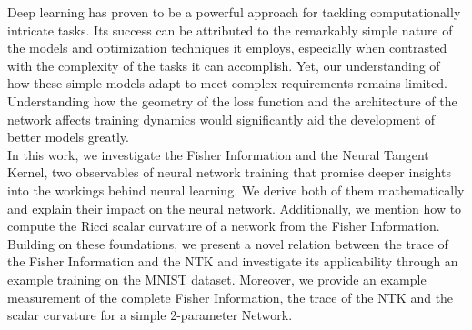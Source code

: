 Deep learning has proven to be a powerful approach for tackling computationally intricate tasks. Its success can be attributed to the remarkably simple nature of the models and optimization techniques it employs, especially when contrasted with the complexity of the tasks it can accomplish. Yet, our understanding of how these simple models adapt to meet complex requirements remains limited. Understanding how the geometry of the loss function and the architecture of the network affects training dynamics would significantly aid the development of better models greatly.\\
In this work, we investigate the Fisher Information and the Neural Tangent Kernel, two observables of neural network training that promise deeper insights into the workings behind neural learning. We derive both of them mathematically and explain their impact on the neural network. Additionally, we mention how to compute the Ricci scalar curvature of a network from the Fisher Information. Building on these foundations, we present a novel relation between the trace of the Fisher Information and the NTK and investigate its applicability through an example training on the MNIST dataset. Moreover, we provide an example measurement of the complete Fisher Information, the trace of the NTK and the scalar curvature for a simple 2-parameter Network.